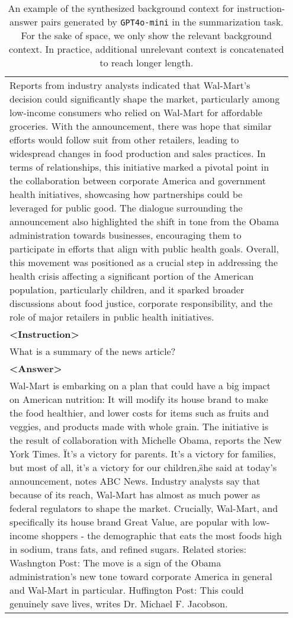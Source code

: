 \begin{table*}[ht]
{\begin{tabular}{p{0.95\linewidth}}
    Reports from industry analysts indicated that Wal-Mart's decision could significantly shape the market, particularly among low-income consumers who relied on Wal-Mart for affordable groceries. With the announcement, there was hope that similar efforts would follow suit from other retailers, leading to widespread changes in food production and sales practices.
    In terms of relationships, this initiative marked a pivotal point in the collaboration between corporate America and government health initiatives, showcasing how partnerships could be leveraged for public good. The dialogue surrounding the announcement also highlighted the shift in tone from the Obama administration towards businesses, encouraging them to participate in efforts that align with public health goals.
    Overall, this movement was positioned as a crucial step in addressing the health crisis affecting a significant portion of the American population, particularly children, and it sparked broader discussions about food justice, corporate responsibility, and the role of major retailers in public health initiatives. \\
    \textbf{<Instruction>} \\
    What is a summary of the news article? \\
    \textbf{<Answer>} \\
    Wal-Mart is embarking on a plan that could have a big impact on American nutrition: It will modify its house brand to make the food healthier, and lower costs for items such as fruits and veggies, and products made with whole grain. The initiative is the result of collaboration with Michelle Obama, reports the New York Times. \"It's a victory for parents. It's a victory for families, but most of all, it's a victory for our children,\" she said at today's announcement, notes ABC News. Industry analysts say that because of its reach, Wal-Mart has almost as much power as federal regulators to shape the market. Crucially, Wal-Mart, and specifically its house brand Great Value, are popular with low-income shoppers - the demographic that eats the most foods high in sodium, trans fats, and refined sugars. Related stories: Washngton Post: The move is a sign of the Obama administration's new tone toward corporate America in general and Wal-Mart in particular. Huffington Post: This could genuinely save lives, writes Dr. Michael F. Jacobson. \\
    \bottomrule
    \end{tabular}
    }
    \caption{An example of the synthesized background context for instruction-answer pairs generated by \texttt{GPT4o-mini} in the summarization task. For the sake of space, we only show the relevant background context. In practice, additional unrelevant context is concatenated to reach longer length.}
    \label{tab:synthesis-context-sum-case}
\end{table*}
\endgroup


